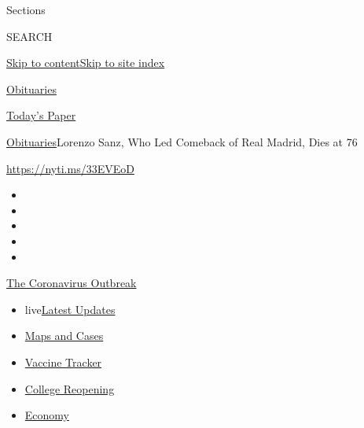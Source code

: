 Sections

SEARCH

\protect\hyperlink{site-content}{Skip to
content}\protect\hyperlink{site-index}{Skip to site index}

\href{https://www.nytimes3xbfgragh.onion/section/obituaries}{Obituaries}

\href{https://myaccount.nytimes3xbfgragh.onion/auth/login?response_type=cookie\&client_id=vi}{}

\href{https://www.nytimes3xbfgragh.onion/section/todayspaper}{Today's
Paper}

\href{/section/obituaries}{Obituaries}\textbar{}Lorenzo Sanz, Who Led
Comeback of Real Madrid, Dies at 76

\url{https://nyti.ms/33EVEoD}

\begin{itemize}
\item
\item
\item
\item
\item
\end{itemize}

\href{https://www.nytimes3xbfgragh.onion/news-event/coronavirus?action=click\&pgtype=Article\&state=default\&region=TOP_BANNER\&context=storylines_menu}{The
Coronavirus Outbreak}

\begin{itemize}
\tightlist
\item
  live\href{https://www.nytimes3xbfgragh.onion/2020/08/04/world/coronavirus-covid-19.html?action=click\&pgtype=Article\&state=default\&region=TOP_BANNER\&context=storylines_menu}{Latest
  Updates}
\item
  \href{https://www.nytimes3xbfgragh.onion/interactive/2020/us/coronavirus-us-cases.html?action=click\&pgtype=Article\&state=default\&region=TOP_BANNER\&context=storylines_menu}{Maps
  and Cases}
\item
  \href{https://www.nytimes3xbfgragh.onion/interactive/2020/science/coronavirus-vaccine-tracker.html?action=click\&pgtype=Article\&state=default\&region=TOP_BANNER\&context=storylines_menu}{Vaccine
  Tracker}
\item
  \href{https://www.nytimes3xbfgragh.onion/2020/08/02/us/covid-college-reopening.html?action=click\&pgtype=Article\&state=default\&region=TOP_BANNER\&context=storylines_menu}{College
  Reopening}
\item
  \href{https://www.nytimes3xbfgragh.onion/live/2020/08/03/business/stock-market-today-coronavirus?action=click\&pgtype=Article\&state=default\&region=TOP_BANNER\&context=storylines_menu}{Economy}
\end{itemize}

